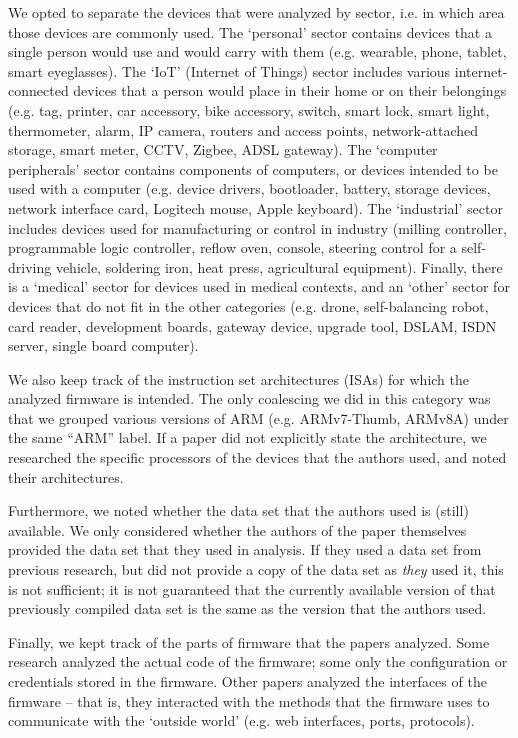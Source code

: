 We opted to separate the devices that were analyzed by sector, i.e. in which area those devices are commonly used.
The `personal' sector contains devices that a single person would use and would carry with them (e.g. wearable, phone, tablet, smart eyeglasses).
The `IoT' (Internet of Things) sector includes various internet-connected devices that a person would place in their home or on their belongings (e.g. tag, printer, car accessory, bike accessory, switch, smart lock, smart light, thermometer, alarm, IP camera, routers and access points, network-attached storage, smart meter, CCTV, Zigbee, ADSL gateway).
The `computer peripherals' sector contains components of computers, or devices intended to be used with a computer (e.g. device drivers, bootloader, battery, storage devices, network interface card, Logitech mouse, Apple keyboard).
The `industrial' sector includes devices used for manufacturing or control in industry (milling controller, programmable logic controller, reflow oven, console, steering control for a self-driving vehicle, soldering iron, heat press, agricultural equipment).
Finally, there is a `medical' sector for devices used in medical contexts, and an `other' sector for devices that do not fit in the other categories (e.g. drone, self-balancing robot, card reader, development boards, gateway device, upgrade tool, DSLAM, ISDN server, single board computer).

We also keep track of the instruction set architectures (ISAs) for which the analyzed firmware is intended.
The only coalescing we did in this category was that we grouped various versions of ARM (e.g. ARMv7-Thumb, ARMv8A) under the same ``ARM'' label.
If a paper did not explicitly state the architecture, we researched the specific processors of the devices that the authors used, and noted their architectures.

Furthermore, we noted whether the data set that the authors used is (still) available.
We only considered whether the authors of the paper themselves provided the data set that they used in analysis.
If they used a data set from previous research, but did not provide a copy of the data set as \textit{they} used it, this is not sufficient; it is not guaranteed that the currently available version of that previously compiled data set is the same as the version that the authors used.

Finally, we kept track of the parts of firmware that the papers analyzed.
Some research analyzed the actual code of the firmware; some only the configuration or credentials stored in the firmware.
Other papers analyzed the interfaces of the firmware -- that is, they interacted with the methods that the firmware uses to communicate with the `outside world' (e.g. web interfaces, ports, protocols).
